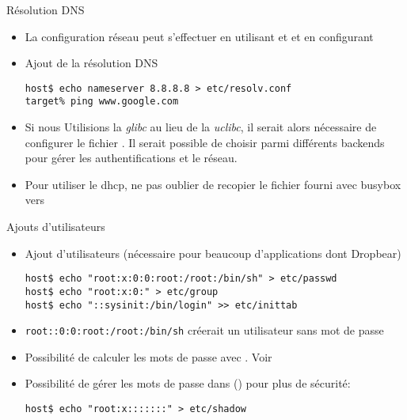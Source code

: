 \begin{frame}[fragile=singleslide]{Résolution DNS}
  \begin{itemize}
    \item La configuration réseau peut s'effectuer en utilisant  et
       et en configurant 
  \item Ajout de la résolution DNS
    \begin{lstlisting}
host$ echo nameserver 8.8.8.8 > etc/resolv.conf
target% ping www.google.com
    \end{lstlisting}
  \item  Si nous Utilisions la  \emph{glibc}  au lieu  de  la \emph{uclibc},  il
    serait    alors    nécessaire    de    configurer    le    fichier
    .   Il  serait   possible  de   choisir  parmi
    différents  backends  pour  gérer  les  authentifications  et  le
    réseau.
  \item Pour utiliser le dhcp, ne pas oublier de recopier le fichier
     fourni avec busybox vers
  \end{itemize}
\end{frame}

\begin{frame}[fragile=singleslide]{Ajouts d'utilisateurs}
  \begin{itemize}
  \item Ajout d'utilisateurs  (nécessaire pour beaucoup d'applications
    dont Dropbear)
    \begin{lstlisting}
host$ echo "root:x:0:0:root:/root:/bin/sh" > etc/passwd
host$ echo "root:x:0:" > etc/group
host$ echo "::sysinit:/bin/login" >> etc/inittab
    \end{lstlisting}
  \item  \verb'root::0:0:root:/root:/bin/sh'  créerait un  utilisateur
    sans mot de passe
  \item Possibilité de calculer les mots de passe avec . Voir
     \item Possibilité de gérer les mots de passe dans
     () pour plus de sécurité:
    \begin{lstlisting}
host$ echo "root:x:::::::" > etc/shadow
    \end{lstlisting}
  \end{itemize}
\end{frame}

